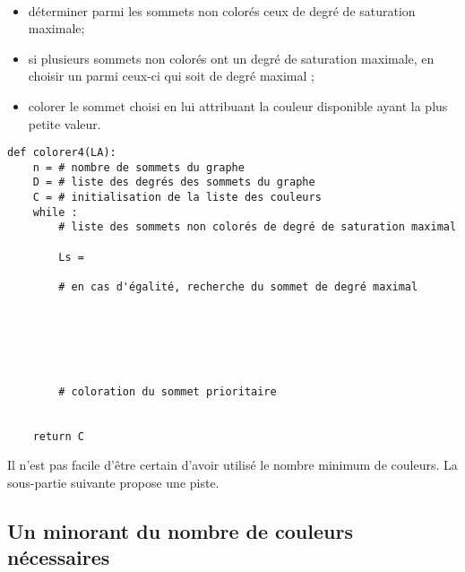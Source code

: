 \ifprof
\begin{corrige}~\\ \vspace{-.5cm}

\end{corrige}
\else
\fi


\begin{itemize}
\item déterminer parmi les sommets non colorés ceux de degré de saturation maximale;
\item si plusieurs sommets non colorés ont un degré de saturation maximale, en choisir un parmi ceux-ci qui soit de degré maximal ;
\item colorer le sommet choisi en lui attribuant la couleur disponible ayant la plus petite valeur.
\end{itemize}
\ifprof
\begin{corrige}

\end{corrige}
\else
\begin{lstlisting}
def colorer4(LA):
    n = # nombre de sommets du graphe
    D = # liste des degrés des sommets du graphe
    C = # initialisation de la liste des couleurs
    while :
        # liste des sommets non colorés de degré de saturation maximal

        Ls =

        # en cas d'égalité, recherche du sommet de degré maximal
        





        # coloration du sommet prioritaire
    
    
    return C
\end{lstlisting}
\fi


\ifprof \else
Il n'est pas facile d'être certain d'avoir utilisé le nombre minimum de couleurs. La sous-partie suivante propose une piste.
\fi

\subsection{Un minorant du nombre de couleurs nécessaires}

